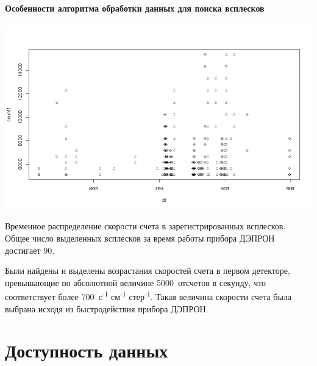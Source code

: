 \documentclass[t, aspectratio=43]{beamer}
\begin{document}
\begin{frame}	
	\frametitle{\insertsection} 
	\framesubtitle{Особенности алгоритма обработки данных для поиска всплесков}
	\centering
	
	\includegraphics[width=0.7\linewidth]{images/Flash/Rplot03.png}
	
{\tiny 	Временное распределение скорости счета в зарегистрированных всплесков. Общее число выделенных всплесков за время работы прибора ДЭПРОН достигает 90.
	
	
	 \begin{flushleft}
	 	Были найдены и выделены возрастания скоростей счета в первом детекторе, превышающие по абсолютной величине 5000~отсчетов в секунду, что соответствует более 700~с\textsuperscript{-1} см\textsuperscript{-1} стер\textsuperscript{-1}. 	Такая величина скорости счета была выбрана исходя из быстродействия прибора ДЭПРОН.
 \end{flushleft}
}
\end{frame}

\section{Доступность данных}
\end{document}
